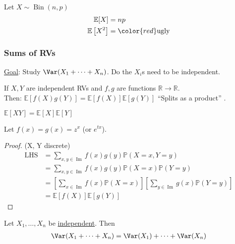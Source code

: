 \begin{example} \label{exm:var-bin}
    Let $X \sim \operatorname{Bin}(n, p)$
    \begin{align*}
        \mathbb{E}[X] &= np  \\
        \mathbb{E}\left[X^2\right] &= \color{red} \text{ugly}
    \end{align*} 
\end{example} 

\subsubsection{Sums of RVs}

\color{blue} \underline{Goal}: Study $\Var(X_1 + \dots + X_n)$. Do the $X_i$s need to be independent. \color{black}

\begin{proposition} \label{prp:expprod}
    If $X, Y$ are \color{red} independent \color{black} RVs and $f, g$ are functions $\mathbb{R} \to \mathbb{R}$. \\
    Then: $\mathbb{E}[f(X) g(Y)] = \mathbb{E}[f(X)] \mathbb{E}[g(Y)]$ \color{blue} ``Splits as a product'' \color{black}.
\end{proposition} 

\begin{example}
    $\mathbb{E}[XY] = \mathbb{E}[X] \mathbb{E}[Y]$
\end{example} 

\begin{example}
    Let $f(x) = g(x) = z^x$ (or $e^{tx}$).
\end{example} 

\begin{proof}
    \color{blue} (X, Y discrete) \color{black}
    \begin{align*}
        \text{LHS} &= \sum_{x, y \in \operatorname{Im}} f(x) g(y) \mathbb{P}(X = x, Y = y) \\
        &= \sum_{x, y \in \operatorname{Im}} f(x) g(y) \mathbb{P}(X = x) \mathbb{P}(Y = y) \\
        &= \left[\sum_{x \in \operatorname{Im}} f(x) \mathbb{P}(X = x) \right] \left[\sum_{y \in \operatorname{Im}} g(x) \mathbb{P}(Y = y) \right] \\
        &= \mathbb{E}[f(X)] \mathbb{E}[g(Y)]
    \end{align*} 
\end{proof} 

\begin{proposition}
    Let $X_1, \dots, X_n$ be \underline{independent}.
    Then
    \begin{align*}
        \Var(X_1 + \dots + X_n) = \Var(X_1) + \dots + \Var(X_n)
    \end{align*} 
\end{proposition} 

